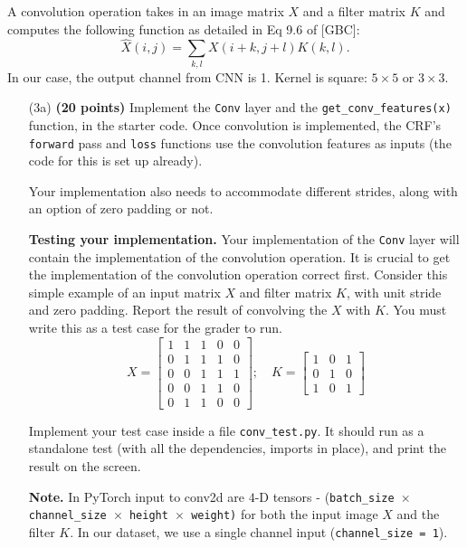 \documentclass[11pt]{report}
\begin{document}
A convolution operation takes in an image matrix $X$ and a filter matrix $K$ and
computes the following function as detailed in Eq 9.6 of [GBC]:
%
\begin{equation}
  \label{eq:conv}
  \hat{X}(i,j) = \sum_{k,l} X(i + k, j+l) K(k,l).
\end{equation}
In our case, the output channel from CNN is 1.
Kernel is square: $5 \times 5$ or $3 \times 3$.

%
\begin{itemize}
\item[(3a)] \textbf{(20 points)} Implement the \texttt{Conv} layer and the
\texttt{get\_conv\_features(x)} function, in the starter code. Once
convolution is implemented, the CRF's \texttt{forward} pass and \texttt{loss}
functions use the convolution features as inputs (the code for this is set up
already).

Your implementation also needs to accommodate different strides,
along with an option of zero padding or not.

\textbf{Testing your implementation.} Your implementation of the {\tt Conv}
layer will contain the implementation of the convolution operation.
It is crucial to get the implementation
of the convolution operation correct first. Consider this simple example of an
input matrix $X$ and filter matrix $K$, with unit stride and zero padding.
Report the result of convolving the $X$ with $K$. You must write this as a test
case for the grader to run.
%
\[
X = \begin{bmatrix}
1 & 1 & 1 & 0 & 0 \\
0 & 1 & 1 & 1 & 0\\
0 & 0 & 1 & 1 & 1\\
0 & 0 & 1 & 1 & 0\\
0 & 1 & 1 & 0 & 0
\end{bmatrix} ; \quad
K = \begin{bmatrix}
1 & 0 & 1 \\
0 & 1 & 0 \\
1 & 0 & 1
\end{bmatrix}
\]

Implement your test case inside a file {\tt conv\_test.py}. It should run
as a standalone test (with all the dependencies, imports in place),
and print the result on the screen.

{\bf Note.} In PyTorch input to conv2d are \(4\)-D tensors - {(\tt batch\_size
	$\times$ channel\_size $\times$ height $\times$ weight)} for both the input
image $X$ and the filter $K$. In our dataset, we use a single channel input
({\tt channel\_size = 1}).



\end{itemize}
\end{document}
